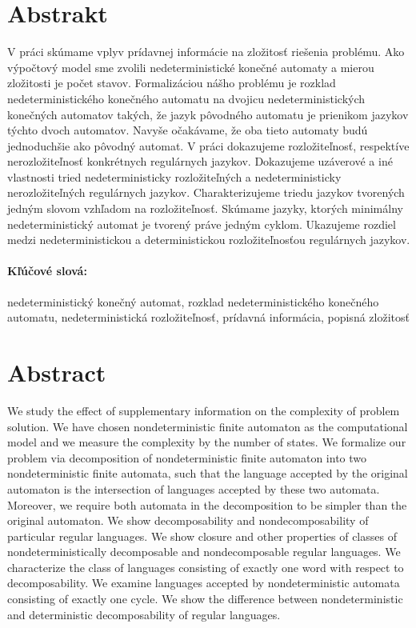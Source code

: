 \documentclass[12pt, oneside]{book}
\begin{document}

\newpage 
\section*{Abstrakt}

V práci skúmame vplyv prídavnej informácie na zložitosť riešenia problému. Ako výpočtový model sme zvolili nedeterministické konečné automaty a mierou zložitosti je počet stavov. Formalizáciou nášho problému je rozklad nedeterministického konečného automatu na dvojicu nedeterministických konečných automatov takých, že jazyk pôvodného automatu je prienikom jazykov týchto dvoch automatov. Navyše očakávame, že oba tieto automaty budú jednoduchšie ako pôvodný automat. V práci dokazujeme rozložiteľnosť, respektíve nerozložiteľnosť konkrétnych regulárnych jazykov. Dokazujeme uzáverové a iné vlastnosti tried nedeterministicky rozložiteľných a nedeterministicky nerozložiteľných regulárnych jazykov. Charakterizujeme triedu jazykov tvorených jedným slovom vzhľadom na rozložiteľnosť. Skúmame jazyky, ktorých minimálny nedeterministický automat je tvorený práve jedným cyklom. Ukazujeme rozdiel medzi nedeterministickou a deterministickou rozložiteľnosťou regulárnych jazykov.

\paragraph*{Kľúčové slová:} nedeterministický konečný automat, rozklad nedeterministického konečného automatu, nedeterministická rozložiteľnosť, prídavná informácia, popisná zložitosť


\newpage 
\section*{Abstract}

We study the effect of supplementary information on the complexity of problem solution. We have chosen nondeterministic finite automaton as the computational model and we measure the complexity by the number of states. We formalize our problem via decomposition of nondeterministic finite automaton into two nondeterministic finite automata, such that the language accepted by the original automaton is the intersection of languages accepted by these two automata. Moreover, we require both automata in the decomposition to be simpler than the original automaton. We show decomposability and nondecomposability of particular regular languages. We show closure and other properties of classes of nondeterministically decomposable and nondecomposable regular languages. We characterize the class of languages consisting of exactly one word with respect to decomposability. We examine languages accepted by nondeterministic automata consisting of exactly one cycle. We show the difference between nondeterministic and deterministic decomposability of regular languages.
\end{document}
